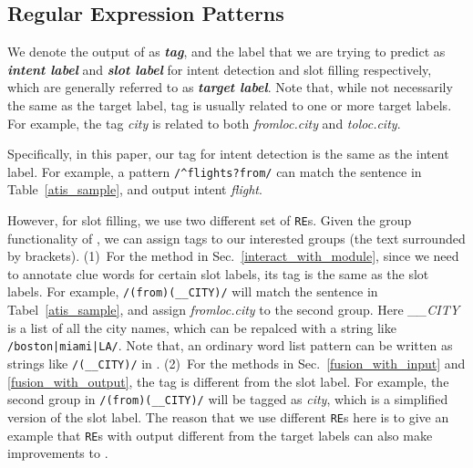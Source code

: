 \subsection{Regular Expression Patterns}
\label{re_desc}
We denote the output of \RE as \textbf{\emph{\RE tag}}, and the label that we are trying to predict as \textbf{\emph{intent label}} and \textbf{\emph{slot label}} for intent detection and slot filling respectively, which are generally referred to as \textbf{\emph{target label}}. Note that, while not necessarily the same as the target label, \RE tag is usually related to one or more target labels. For example, the \RE tag \emph{city} is related to both \emph{fromloc.city} and \emph{toloc.city}.

Specifically, in this paper, our \RE tag for intent detection is the same as the intent label. For example, a pattern 
\texttt{/\textasciicircum flights?\:from/} can match the sentence in Table~\ref{atis_sample}, and output intent \emph{flight}. 

However, for slot filling, we use two different set of \texttt{RE}s. 
Given the group functionality of \RE, we can assign tags to our interested groups (the text surrounded by brackets). 
(1)~For the method in Sec.~\ref{interact_with_module}, since we need to annotate clue words for certain slot labels, its \RE tag is the same as the slot labels. 
For example, \texttt{/(from)\:(\_\_CITY)/} will match the sentence in Tabel~\ref{atis_sample}, and assign \emph{fromloc.city} to the second group. 
Here \emph{\_\_CITY} is a list of all the city names, which can be repalced with a string like \texttt{/boston|miami|LA/}. 
Note that, an ordinary word list pattern can be written as strings like \texttt{/(\_\_CITY)/} in \RE.
(2)~For the methods in Sec.~\ref{fusion_with_input} and \ref{fusion_with_output}, the \RE tag is different from the slot label. For example, the second group in \texttt{/(from)\:(\_\_CITY)/} will be tagged as \emph{city}, which is a simplified version of the slot label. The reason that we use different \texttt{RE}s here is to give an example that \texttt{RE}s with output different from the target labels can also make improvements to \NN.


